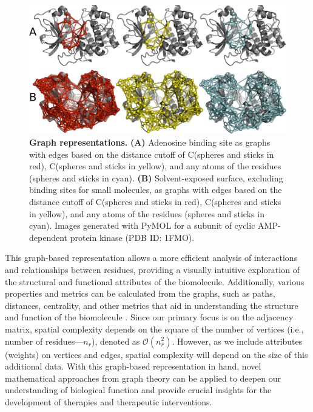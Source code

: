 \documentclass[Ingles]{phdthesis}
\def\ie{i.e.\onedot}
\begin{document}
\begin{figure}[ht]
\centerline{\includegraphics[scale=1.9]{images/graph-representation.png}}
\caption[Graph representations]{\textbf{Graph representations.} \textbf{(A)} Adenosine binding site as graphs with edges based on the distance cutoff of C\textalpha\space (spheres and sticks in red), C\textbeta\space (spheres and sticks in yellow), and any atoms of the residues (spheres and sticks in cyan). \textbf{(B)} Solvent-exposed surface, excluding binding sites for small molecules, as graphs with edges based on the distance cutoff of C\textalpha\space (spheres and sticks in red), C\textbeta\space (spheres and sticks in yellow), and any atoms of the residues (spheres and sticks in cyan). Images generated with PyMOL for a subunit of cyclic AMP-dependent protein kinase (PDB ID: 1FMO).}
\label{fig:graph-representation}
\end{figure}

This graph-based representation allows a more efficient analysis of interactions and relationships between residues, providing a visually intuitive exploration of the structural and functional attributes of the biomolecule. Additionally, various properties and metrics can be calculated from the graphs, such as paths, distances, centrality, and other metrics that aid in understanding the structure and function of the biomolecule \cite{majeed2020,vishveshwara2002,mason2007}. Since our primary focus is on the adjacency matrix, spatial complexity depends on the square of the number of vertices (\ie, number of residues---$n_r$), denoted as $\mathcal{O}(n_{r}^{2})$. However, as we include attributes (weights) on vertices and edges, spatial complexity will depend on the size of this additional data. With this graph-based representation in hand, novel mathematical approaches from graph theory can be applied to deepen our understanding of biological function and provide crucial insights for the development of therapies and therapeutic interventions.
\end{document}
